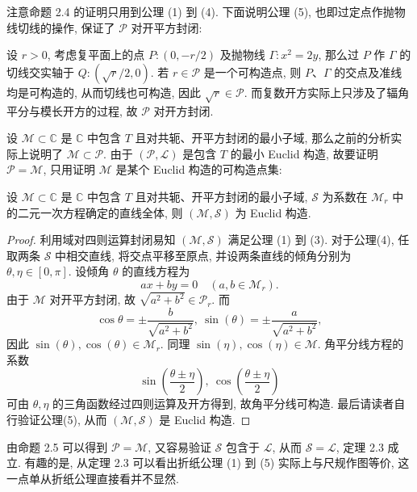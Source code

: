注意命题 2.4 的证明只用到公理 (1) 到 (4). 下面说明公理 (5), 
也即过定点作抛物线切线的操作, 保证了 $\mathcal{P}$ 对开平方封闭: 

设 $r>0$, 考虑复平面上的点 $P:(0,-r/2)$ 及抛物线 $\Gamma:x^2=2y$, 
那么过 $P$ 作 $\Gamma$ 的切线交实轴于 $Q:(\sqrt{r}/2,0)$. 
若 $r\in\mathcal{P}$ 是一个可构造点, 
则 $P$、$\Gamma$ 的交点及准线均是可构造的, 从而切线也可构造, 
因此 $\sqrt{r}\in\mathcal{P}$. 
而复数开方实际上只涉及了辐角平分与模长开方的过程, 故 $\mathcal{P}$ 对开方封闭. 

设 $\mathcal{M}\subset\mathbb{C}$ 是 $\mathbb{C}$ 中包含 $T$ 且对共轭、开平方封闭的最小子域, 
那么之前的分析实际上说明了 $\mathcal{M}\subset\mathcal{P}$. 
由于 $(\mathcal{P},\mathcal{L})$ 是包含 $T$ 的最小 Euclid 构造, 
故要证明 $\mathcal{P}=\mathcal{M}$, 
只用证明 $\mathcal{M}$ 是某个 Euclid 构造的可构造点集: 

\begin{proposition}
    设 $\mathcal{M}\subset\mathbb{C}$ 是 $\mathbb{C}$ 中包含 $T$ 且对共轭、开平方封闭的最小子域, 
    $\mathcal{S}$ 为系数在 $\mathcal{M}_r$ 中的二元一次方程确定的直线全体, 
    则 $(\mathcal{M},\mathcal{S})$ 为 Euclid 构造. 
\end{proposition}

\begin{proof}
    利用域对四则运算封闭易知 $(\mathcal{M},\mathcal{S})$ 满足公理 (1) 到 (3). 
    对于公理(4), 任取两条 $\mathcal{S}$ 中相交直线, 将交点平移至原点, 
    并设两条直线的倾角分别为 $\theta,\eta\in[0,\pi]$. 
    设倾角 $\theta$ 的直线方程为
    $$
    ax+by=0\quad (a,b\in\mathcal{M}_r). 
    $$
    由于 $\mathcal{M}$ 对开平方封闭, 故 $\sqrt{a^2+b^2}\in\mathcal{P}_r$. 而
    $$
    \cos{\theta}=\pm\frac{b}{\sqrt{a^2+b^2}},\ \sin(\theta)=\pm\frac{a}{\sqrt{a^2+b^2}},
    $$
    因此 $\sin(\theta),\cos(\theta)\in\mathcal{M}_r$. 
    同理 $\sin(\eta),\cos(\eta)\in\mathcal{M}$. 角平分线方程的系数
    $$
    \sin(\frac{\theta\pm\eta}{2}),\ \cos(\frac{\theta\pm\eta}{2})
    $$
    可由 $\theta,\eta$ 的三角函数经过四则运算及开方得到, 
    故角平分线可构造. 
    最后请读者自行验证公理(5), 
    从而 $(\mathcal{M},\mathcal{S})$ 是 Euclid 构造. 
\end{proof}

由命题 2.5 可以得到 $\mathcal{P}=\mathcal{M}$, 
又容易验证 $\mathcal{S}$ 包含于 $\mathcal{L}$, 
从而 $\mathcal{S}=\mathcal{L}$, 定理 2.3 成立. 
有趣的是, 从定理 2.3 可以看出折纸公理 (1) 到 (5) 实际上与尺规作图等价, 
这一点单从折纸公理直接看并不显然. 